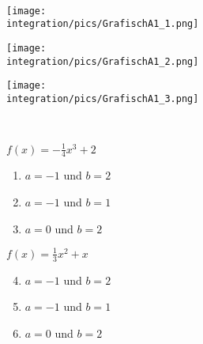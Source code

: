 \begin{Exercise}[title={\raggedright\normalfont Schätze jeweils den Wert der Integrale zwischen der unteren Grenze \(a\) und der oberen Grenze \(b\) an Hand des Schaubilds der Funktion ab.}, label=integralGrafisch1]\\
	\begin{minipage}{\textwidth}
		\begin{minipage}{.33\textwidth}
			\texttt{[image: \\integration/pics/GrafischA1\_1.png]}
		\end{minipage}
		\begin{minipage}{.33\textwidth}
			\texttt{[image: \\integration/pics/GrafischA1\_2.png]}
		\end{minipage}
		\begin{minipage}{.33\textwidth}
			\texttt{[image: \\integration/pics/GrafischA1\_3.png]}
		\end{minipage}
	\end{minipage}
	\vspace{0.3cm}\\
	\begin{minipage}{\textwidth}
		\begin{minipage}{.33\textwidth}\raggedright
			\(f(x)=-\frac{1}{4}x^3+2\)
			\begin{enumerate}[label=\alph*)]
				\setcounter{enumi}{0}
				\item \(a=-1\) und \(b=2\)
				\item \(a=-1\) und \(b=1\)
				\item \(a=0\) und \(b=2\)
			\end{enumerate}
		\end{minipage}
		\begin{minipage}{.33\textwidth}\raggedright
			\(f(x)=\frac{1}{3}x^2+x\)
			\begin{enumerate}[label=\alph*)]
				\setcounter{enumi}{3}
				\item \(a=-1\) und \(b=2\)
				\item \(a=-1\) und \(b=1\)
				\item \(a=0\) und \(b=2\)
			\end{enumerate}
		\end{minipage}
		\begin{minipage}{.33\textwidth}\raggedright

\end{minipage}
\end{minipage}
\end{Exercise}

